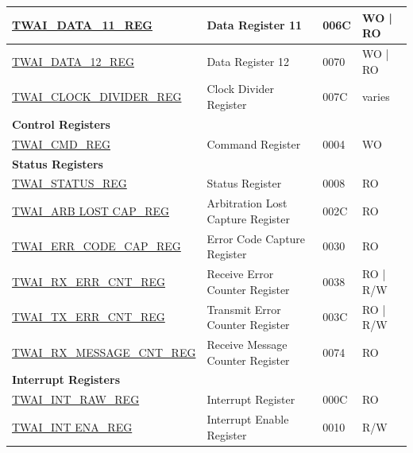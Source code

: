 \begin{longtable}{ | p{6cm} | p{6cm} | p{1.2cm} | p{2cm} | }
\hyperref[regdesc:TWAIDATA11REG]{TWAI\_DATA\_11\_REG} & Data Register 11 & \hexprefix{}006C & WO | RO \\ \hline
\hyperref[regdesc:TWAIDATA12REG]{TWAI\_DATA\_12\_REG} & Data Register 12 & \hexprefix{}0070 & WO | RO \\ \hline
\hyperref[regdesc:TWAICLOCKDIVIDERREG]{TWAI\_CLOCK\_DIVIDER\_REG} & Clock Divider Register & \hexprefix{}007C & varies \\ \hline
\multicolumn{4}{|l|}{\textbf{Control Registers}} \\ \hline
\hyperref[regdesc:TWAICMDREG]{TWAI\_CMD\_REG} & Command Register & \hexprefix{}0004 & WO \\ \hline
\multicolumn{4}{|l|}{\textbf{Status Registers}} \\ \hline
\hyperref[regdesc:TWAISTATUSREG]{TWAI\_STATUS\_REG} & Status Register & \hexprefix{}0008 & RO \\ \hline
\hyperref[regdesc:TWAIARB LOST CAPREG]{TWAI\_ARB LOST CAP\_REG} & Arbitration Lost Capture Register & \hexprefix{}002C & RO \\ \hline
\hyperref[regdesc:TWAIERRCODECAPREG]{TWAI\_ERR\_CODE\_CAP\_REG} & Error Code Capture Register & \hexprefix{}0030 & RO \\ \hline
\hyperref[regdesc:TWAIRXERRCNTREG]{TWAI\_RX\_ERR\_CNT\_REG} & Receive Error Counter Register & \hexprefix{}0038 & RO | R/W \\ \hline
\hyperref[regdesc:TWAITXERRCNTREG]{TWAI\_TX\_ERR\_CNT\_REG} & Transmit Error Counter Register & \hexprefix{}003C & RO | R/W \\ \hline
\hyperref[regdesc:TWAIRXMESSAGECNTREG]{TWAI\_RX\_MESSAGE\_CNT\_REG} & Receive Message Counter Register & \hexprefix{}0074 & RO \\ \hline
\multicolumn{4}{|l|}{\textbf{Interrupt Registers}} \\ \hline
\hyperref[regdesc:TWAIINTRAWREG]{TWAI\_INT\_RAW\_REG} & Interrupt Register & \hexprefix{}000C & RO \\ \hline
\hyperref[regdesc:TWAIINT ENAREG]{TWAI\_INT ENA\_REG} & Interrupt Enable Register & \hexprefix{}0010 & R/W \\ \hline
\end{longtable}
